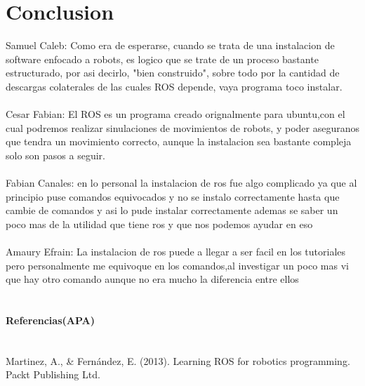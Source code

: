 \documentclass[11pt,a4paper]{article}
\begin{document}
\section{Conclusion}
Samuel Caleb:
Como era de esperarse, cuando se trata de una instalacion de software enfocado a robots, es logico que se trate de un proceso bastante estructurado, por asi decirlo, "bien construido", sobre todo por la cantidad de descargas colaterales de las cuales ROS depende, vaya programa toco instalar. \\ 
\\
Cesar Fabian:
El ROS es un programa creado orignalmente para ubuntu,con el cual podremos realizar sinulaciones de movimientos de robots, y poder aseguranos que tendra un movimiento correcto, aunque la instalacion sea bastante compleja solo son pasos a seguir.
\\ \\
Fabian Canales:
en lo personal la instalacion de ros fue algo complicado ya que al principio puse comandos equivocados y no se instalo correctamente hasta que cambie de comandos y asi lo pude instalar correctamente 
ademas se saber un poco mas de la utilidad que tiene ros y que nos podemos ayudar en eso 
\\ \\
Amaury Efrain:
La instalacion de ros puede a llegar a ser facil en los tutoriales pero personalmente me equivoque en los comandos,al investigar un poco mas vi que hay otro comando aunque no era mucho la diferencia entre ellos 
\\ \\
\paragraph{Referencias(APA)}\\

Martinez, A., & Fernández, E. (2013). Learning ROS for robotics programming. Packt Publishing Ltd.
\end{document}
